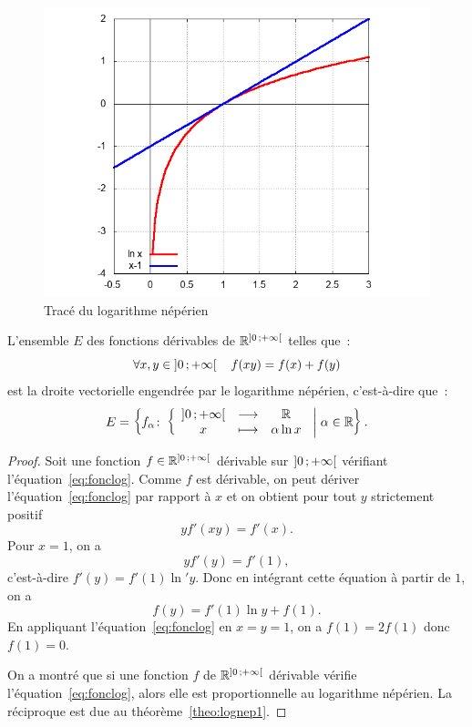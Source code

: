 %
\begin{figure}
  \centering
  \includegraphics[scale=0.4, angle=-90]{lognep.png}
  \caption{Tracé du logarithme népérien}
  \label{fig:traceln}
\end{figure}
%
\begin{theo}
  L'ensemble $E$ des fonctions dérivables de $\mathbb{R}^{\left] 0 \, ;  +\infty \right[}$ telles que~:
  \begin{equation}
    \label{eq:fonclog}
    \forall x, y \in \left] 0 \, ;  +\infty \right[ \quad f(xy)=f(x)+f(y)
  \end{equation}
  est la droite vectorielle engendrée par le logarithme népérien, c'est-à-dire que~:
  \begin{equation}
    E=\left\{f_{\alpha}\colon \left\{\begin{array}{ccc} \left] 0 \, ;  +\infty \right[ & \longrightarrow &\mathbb{R}\\ x & \longmapsto & \alpha \ln x \end{array} \right.\mathrel{}\middle|\mathrel{}\alpha \in \mathbb{R}\right\}.
  \end{equation}
\end{theo}
\begin{proof}
  Soit une fonction $f \in \mathbb{R}^{\left] 0 \, ;  +\infty \right[}$ dérivable sur $\left] 0 \, ;  +\infty \right[$ vérifiant l'équation~\eqref{eq:fonclog}. Comme $f$ est dérivable, on peut dériver l'équation~\eqref{eq:fonclog} par rapport à $x$ et on obtient pour tout $y$ strictement positif
  \begin{equation}
    y f'(xy)=f'(x).
  \end{equation}
  Pour $x=1$, on a
  \begin{equation}
    y f'(y)=f'(1),
  \end{equation}
  c'est-à-dire $f'(y)=f'(1) \ln' y$. Donc en intégrant cette équation à partir de $1$, on a
  \begin{equation}
    f(y)=f'(1)\ln y + f(1).
  \end{equation}
  En appliquant l'équation~\eqref{eq:fonclog} en $x=y=1$, on a $f(1)=2f(1)$ donc $f(1)=0$.

  On a montré que si une fonction $f$ de $\mathbb{R}^{\left] 0 \, ;  +\infty \right[}$ dérivable vérifie l'équation~\eqref{eq:fonclog}, alors elle est proportionnelle au logarithme népérien. La réciproque est due au théorème~\ref{theo:lognep1}.
\end{proof}
%
